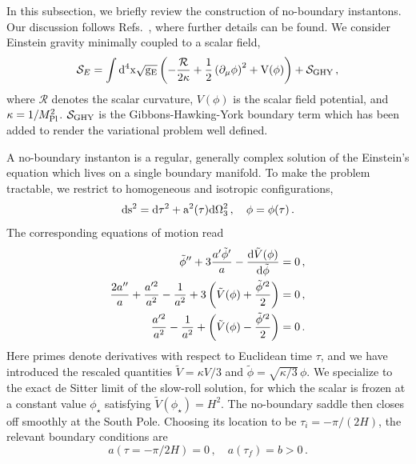\documentclass[a4paper,11pt]{article}
\begin{document}
In this subsection, we briefly review the construction of no-boundary instantons. Our discussion follows Refs.~\cite{Lehners:2023yrj,Maldacena:2024uhs,Janssen_2021}, where further details can be found. We consider Einstein gravity minimally coupled to a scalar field,
\begin{equation}
    \mathcal{S}_E = \int \rm{d}^4 x \sqrt{g_E} \left(-\frac{\mathcal{R}}{2\kappa}+\frac{1}{2}\left(\partial_\mu\phi\right)^2 +V(\phi)\right)+\mathcal{S}_{GHY}\,,
\end{equation}
where $\mathcal{R}$ denotes the scalar curvature, $V(\phi)$ is the scalar field potential, and $\kappa=1/M_{\rm Pl}^2$. $\mathcal{S}_{\rm GHY}$ is the Gibbons-Hawking-York boundary term which has been added to render the variational problem well defined. 

A no-boundary instanton is a regular, generally complex solution of the Einstein's equation which lives on a single boundary manifold. To make the problem tractable, we restrict to homogeneous and isotropic configurations,
\begin{equation}
    \rm{d}s^2 = \rm{d}\tau^2 + a^2(\tau) d\Omega_3^2\,,\quad \phi =\phi(\tau)\,.
\end{equation}
The corresponding equations of motion read
\begin{subequations}
\begin{align}
\tilde{\phi}''+3\frac{a'\tilde{\phi}'}{a}-\frac{{\rm d}\tilde{V}(\phi)}{{\rm d} \tilde{\phi}} &= 0\,,
\\
\frac{2a''}{a}+\frac{a'^2}{a^2}-\frac{1}{a^2}  + 3 \left(\tilde{V}(\phi)+\frac{\tilde{\phi}'^2}{2} \right) & =0  \,, 
\\
\frac{a'^2}{a^2} -\frac{1}{a^2}  + \left(\tilde{V}(\phi)-\frac{\tilde{\phi}'^2}{2} \right) & =0 \,. 
\label{eq:eoms0}
\end{align}
\end{subequations}
Here primes denote derivatives with respect to Euclidean time $\tau$, and we have introduced the rescaled quantities
$\tilde{V}=\kappa V/3$ and $\tilde{\phi}=\sqrt{\kappa/3}\,\phi$. We specialize to the exact de Sitter limit of the slow-roll solution, for which the scalar is frozen at a constant value $\phi_\star$ satisfying
$\tilde{V}(\phi_\star)=H^2$. The no-boundary saddle then closes off smoothly at the South Pole. Choosing its location to be $\tau_i=-\pi/(2H)$, the relevant boundary conditions are
\begin{equation}
    a(\tau = -\pi/2H) =0\,,\quad a(\tau_f) =b >0 \,.
\label{eq:no-boundaryBCs}
\end{equation}
\end{document}
